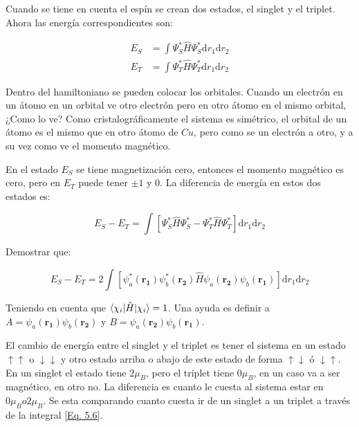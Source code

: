 \documentclass[11pt,fleqn]{book}
\renewcommand{\vec}[1]{\mathbf{#1}}
\begin{document}
Cuando se tiene en cuenta el espín se crean dos estados, el singlet y el triplet.  Ahora las energía correspondientes son:

\begin{equation}
    \begin{split}
        E_{S}&=\int\Psi_{S}^{\ast}\hat{H}\Psi_{S}^{\ast}\mathrm{d}r_{1}\mathrm{d}r_{2}\\
        E_{T}&=\int\Psi_{T}^{\ast}\hat{H}\Psi_{T}^{\ast}\mathrm{d}r_{1}\mathrm{d}r_{2}
    \end{split}
\end{equation}

Dentro del hamiltoniano se pueden colocar los orbitales. Cuando un electrón en un átomo en un orbital ve otro electrón pero en otro átomo en el mismo orbital, ¿Como lo ve? Como cristalográficamente el sistema es simétrico, el orbital de un átomo es el mismo que en otro átomo de $Cu$, pero como se un electrón a otro, y a su vez como ve el momento magnético.

En el estado $E_{S}$ se tiene magnetización cero, entonces el momento magnético es cero, pero en $E_{T}$ puede tener $\pm1$ y $0$. La diferencia de energía en estos dos estados es:

\begin{equation}
    E_{S}-E_{T}=\int\left[\Psi_{S}^{\ast}\hat{H}\Psi_{S}^{\ast}-\Psi_{T}^{\ast}\hat{H}\Psi_{T}^{\ast}\right]\mathrm{d}r_{1}\mathrm{d}r_{2}  
    \label{Eq. 5.5}
\end{equation}

\begin{exercise}[Demostración]
Demostrar que:

\begin{equation}
    E_{S}-E_{T}=2\int\left[\psi_{a}^{\ast}(\vec{r_{1}})\psi_{b}^{\ast}(\vec{r_{2}})\hat{H}\psi_{a}(\vec{r_{2}})\psi_{b}(\vec{r_{1}})\right]\mathrm{d}r_{1}\mathrm{d}r_{2}
    \label{Eq. 5.6}
\end{equation}

Teniendo en cuenta que $\braket{\chi_{i}|\hat{H}|\chi_{i}}=1$. Una ayuda es definir a $A=\psi_{a}(\vec{r_{1}})\psi_{b}(\vec{r_{2}})$ y $B=\psi_{a}(\vec{r_{2}})\psi_{b}(\vec{r_{1}})$.
\end{exercise}


El cambio de energía  entre el singlet y el triplet es tener el sistema en un estado $\uparrow\uparrow$ o $\downarrow\downarrow$ y otro estado arriba o abajo de este estado de forma $\uparrow\downarrow$ ó $\downarrow\uparrow$. En un singlet el estado tiene $2\mu_{B}$, pero el triplet tiene $0\mu_{B}$, en un caso va a ser magnético, en otro no. La diferencia es cuanto le cuesta al sistema estar en $0\mu_{B} o 2\mu_{B}$. Se esta comparando cuanto cuesta ir de un singlet a un triplet a través de la integral \ref{Eq. 5.6}. 
\end{document}
